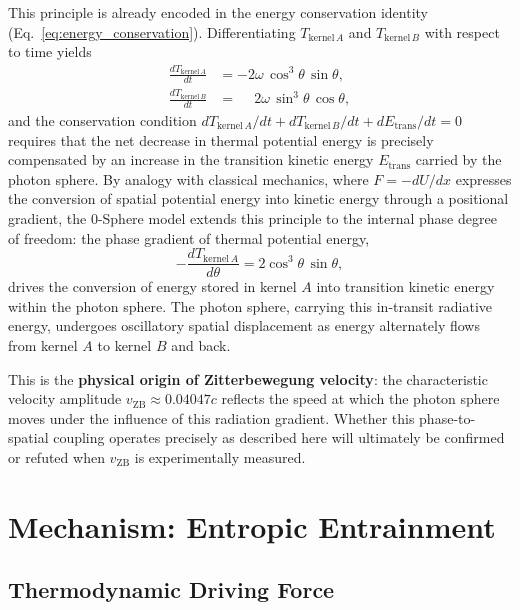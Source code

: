\documentclass[12pt,letterpaper]{article}
\begin{document}
This principle is already encoded in the energy conservation identity (Eq.~\ref{eq:energy_conservation}). Differentiating $T_{\mathrm{kernel}\,A}$ and $T_{\mathrm{kernel}\,B}$ with respect to time yields
\begin{align*}
  \frac{dT_{\mathrm{kernel}\,A}}{dt} &= -2\omega\,\cos^3\!\theta\,\sin\theta, \\
  \frac{dT_{\mathrm{kernel}\,B}}{dt} &= \phantom{-}2\omega\,\sin^3\!\theta\,\cos\theta,
\end{align*}
and the conservation condition $dT_{\mathrm{kernel}\,A}/dt + dT_{\mathrm{kernel}\,B}/dt + dE_{\mathrm{trans}}/dt = 0$ requires that the net decrease in thermal potential energy is precisely compensated by an increase in the transition kinetic energy $E_{\mathrm{trans}}$ carried by the photon sphere. By analogy with classical mechanics, where $F = -dU/dx$ expresses the conversion of spatial potential energy into kinetic energy through a positional gradient, the 0-Sphere model extends this principle to the internal phase degree of freedom: the phase gradient of thermal potential energy,
\[
  -\frac{dT_{\mathrm{kernel}\,A}}{d\theta} = 2\cos^3\!\theta\,\sin\theta,
\]
drives the conversion of energy stored in kernel $A$ into transition kinetic energy within the photon sphere. The photon sphere, carrying this in-transit radiative energy, undergoes oscillatory spatial displacement as energy alternately flows from kernel $A$ to kernel $B$ and back.

This is the \textbf{physical origin of Zitterbewegung velocity}: the characteristic velocity amplitude $v_{\mathrm{ZB}} \approx 0.04047c$ reflects the speed at which the photon sphere moves under the influence of this radiation gradient. Whether this phase-to-spatial coupling operates precisely as described here will ultimately be confirmed or refuted when $v_{\mathrm{ZB}}$ is experimentally measured.



\section{Mechanism: Entropic Entrainment}
\label{sec:mechanism}

\justifying

\subsection{Thermodynamic Driving Force}
\label{subsec:thermodynamic_force}
\end{document}
